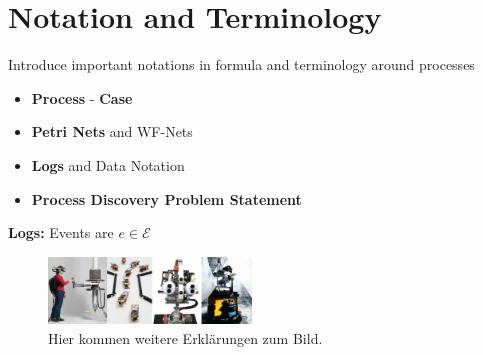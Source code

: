 \documentclass[a4paper]{IEEEtran}
\begin{document}
\section{Notation and Terminology}
Introduce important notations in formula and terminology around processes

\begin{itemize}

    \item \textbf{Process} -  \textbf{Case}
    \item \textbf{Petri Nets} and WF-Nets 
    \item \textbf{Logs} and Data Notation
    \item \textbf{Process Discovery Problem Statement}
\end{itemize}
\textbf{Logs:} Events are $e \in \mathcal{E}$
\begin{figure}[!h]
    \centering
    \includegraphics[width=0.48\textwidth]{Bild.png}
    \caption{Hier kommen weitere Erklärungen zum Bild.}
    \label{fig:bild}
\end{figure}




\end{document}
